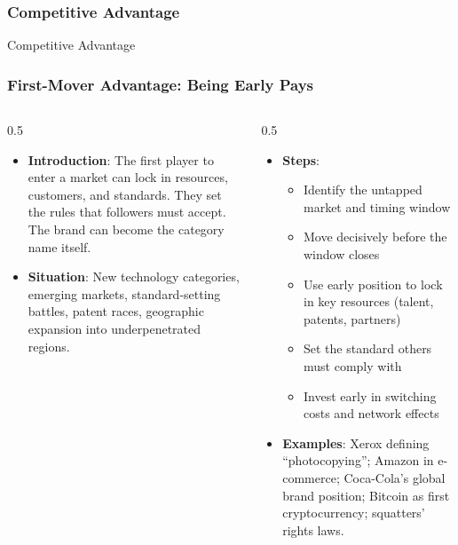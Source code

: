 \begin{frame}[fragile]\frametitle{Competitive Advantage}
\begin{center}
{\Large Competitive Advantage}
\end{center}
\end{frame}

\begin{frame}[fragile]\frametitle{First-Mover Advantage: Being Early Pays}
\begin{columns}
    \begin{column}[T]{0.5\linewidth}
      \begin{itemize}
        \item \textbf{Introduction}: The first player to enter a market can lock in resources, customers, and standards. They set the rules that followers must accept. The brand can become the category name itself.
        \item \textbf{Situation}: New technology categories, emerging markets, standard-setting battles, patent races, geographic expansion into underpenetrated regions.
      \end{itemize}
    \end{column}
    \begin{column}[T]{0.5\linewidth}
      \begin{itemize}
        \item \textbf{Steps}:
        \begin{itemize}
          \item Identify the untapped market and timing window
          \item Move decisively before the window closes
          \item Use early position to lock in key resources (talent, patents, partners)
          \item Set the standard others must comply with
          \item Invest early in switching costs and network effects
        \end{itemize}\item \textbf{Examples}: Xerox defining ``photocopying''; Amazon in e-commerce; Coca-Cola's global brand position; Bitcoin as first cryptocurrency; squatters' rights laws.
      \end{itemize}
    \end{column}
  \end{columns}
\end{frame}

